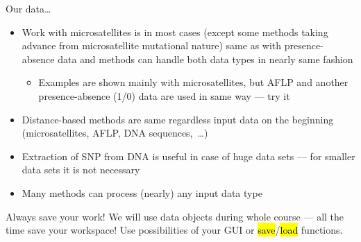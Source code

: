\documentclass[compress, ucs, xelatex, 11pt, xcolor=svgnames,
	hyperref={
		bookmarks=true,
		unicode=true,
		colorlinks=true,
		pdftitle={Molecular data in R},
		plainpages=false,
		pdfauthor={Vojtech Zeisek},
		pdfsubject={Course about phylogeny and evolution in R},
		pdfcreator={XeLaTeX},
		pdfkeywords={R, evolution, phylogeny, molecular data},
		linkcolor=Tomato,
		anchorcolor=SaddleBrown,
		citecolor=Goldenrod,
		filecolor=DarkMagenta,
		menucolor=Sienna,
		urlcolor=DarkTurquoise,
		pdftex},
	url={hyphens, lowtilde} %
	]{beamer}
\renewcommand{\texttt}[1]{\hl{\ttfamily #1}}
\begin{document}
\begin{frame}[allowframebreaks]{Our data\ldots}
\begin{itemize}
\begin{itemize}
		\end{itemize}
		\item Work with microsatellites is in most cases (except some methods taking advance from microsatellite mutational nature) same as with presence-absence data and methods can handle both data types in nearly same fashion
		\begin{itemize}
			\item Examples are shown mainly with microsatellites, but AFLP and another presence-absence (1/0) data are used in same way --- try it
		\end{itemize}
		\item Distance-based methods are same regardless input data on the beginning (microsatellites, AFLP, DNA sequences,~\ldots)
		\item Extraction of SNP from DNA is useful in case of huge data sets --- for smaller data sets it is not necessary
		\item Many methods can process (nearly) any input data type
	\end{itemize}
	\begin{block}{Always save your work!}
		\alert{We will use data objects during whole course --- all the time save your workspace!} Use possibilities of your GUI or \texttt{save}/\texttt{load} functions.
	\end{block}
\end{frame}
\end{document}
